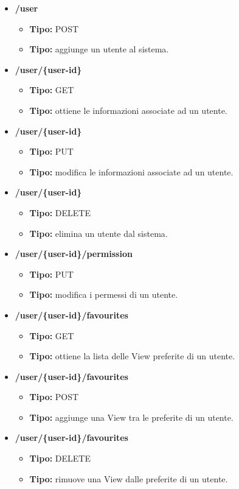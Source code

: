 \begin{itemize}

  \item \textbf{/user}
  \begin{itemize}
    \item \textbf{Tipo:} POST
    \item \textbf{Tipo:} aggiunge un utente al sistema.
  \end{itemize}
  \item \textbf{/user/\{user-id\}}
  \begin{itemize}
    \item \textbf{Tipo:} GET
    \item \textbf{Tipo:} ottiene le informazioni associate ad un utente.
  \end{itemize}
  \item \textbf{/user/\{user-id\}}
  \begin{itemize}
    \item \textbf{Tipo:} PUT
    \item \textbf{Tipo:} modifica le informazioni associate ad un utente.
  \end{itemize}
  \item \textbf{/user/\{user-id\}}
  \begin{itemize}
    \item \textbf{Tipo:} DELETE
    \item \textbf{Tipo:} elimina un utente dal sistema.
  \end{itemize}
  \item \textbf{/user/\{user-id\}/permission}
  \begin{itemize}
    \item \textbf{Tipo:} PUT
    \item \textbf{Tipo:} modifica i permessi di un utente.
  \end{itemize}
  \item \textbf{/user/\{user-id\}/favourites}
  \begin{itemize}
    \item \textbf{Tipo:} GET
    \item \textbf{Tipo:} ottiene la lista delle View preferite di un utente.
  \end{itemize}
  \item \textbf{/user/\{user-id\}/favourites}
  \begin{itemize}
    \item \textbf{Tipo:} POST
    \item \textbf{Tipo:} aggiunge una View tra le preferite di un utente.
  \end{itemize}
  \item \textbf{/user/\{user-id\}/favourites}
  \begin{itemize}
    \item \textbf{Tipo:} DELETE
    \item \textbf{Tipo:} rimuove una View dalle preferite di un utente.
  \end{itemize}


\end{itemize}

